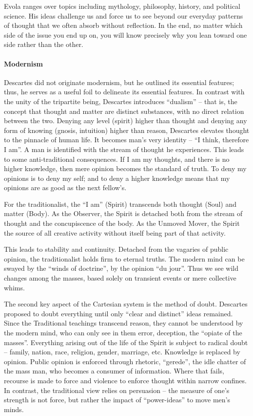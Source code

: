 Evola ranges over topics including mythology, philosophy, history, and political science. His ideas challenge us and force us to see beyond our everyday patterns of thought that we often absorb without reflection. In the end, no matter which side of the issue you end up on, you will know precisely why you lean toward one side rather than the other.

\paragraph{Modernism} Descartes did not originate modernism, but he outlined its essential features; thus, he serves as a useful foil to delineate its essential features. In contrast with the unity of the tripartite being, Descartes introduces “dualism” – that is, the concept that thought and matter are distinct substances, with no direct relation between the two. Denying any level (spirit) higher than thought and denying any form of knowing (gnosis, intuition) higher than reason, Descartes elevates thought to the pinnacle of human life. It becomes man's very identity – “I think, therefore I am”. A man is identified with the stream of thought he experiences. This leads to some anti-traditional consequences. If I am my thoughts, and there is no higher knowledge, then mere opinion becomes the standard of truth. To deny my opinions is to deny my self; and to deny a higher knowledge means that my opinions are as good as the next fellow's.

For the traditionalist, the “I am” (Spirit) transcends both thought (Soul) and matter (Body). As the Observer, the Spirit is detached both from the stream of thought and the concupiscence of the body. As the Unmoved Mover, the Spirit the source of all creative activity without itself being part of that activity.

This leads to stability and continuity. Detached from the vagaries of public opinion, the traditionalist holds firm to eternal truths. The modern mind can be swayed by the “winds of doctrine”, by the opinion “du jour”. Thus we see wild changes among the masses, based solely on transient events or mere collective whims.

The second key aspect of the Cartesian system is the method of doubt. Descartes proposed to doubt everything until only “clear and distinct” ideas remained. Since the Traditional teachings transcend reason, they cannot be understood by the modern mind, who can only see in them error, deception, the “opiate of the masses”. Everything arising out of the life of the Spirit is subject to radical doubt – family, nation, race, religion, gender, marriage, etc. Knowledge is replaced by opinion. Public opinion is enforced through rhetoric, “gerede”, the idle chatter of the mass man, who becomes a consumer of information. Where that fails, recourse is made to force and violence to enforce thought within narrow confines. In contrast, the traditional view relies on persuasion – the measure of one's strength is not force, but rather the impact of “power-ideas” to move men's minds.

